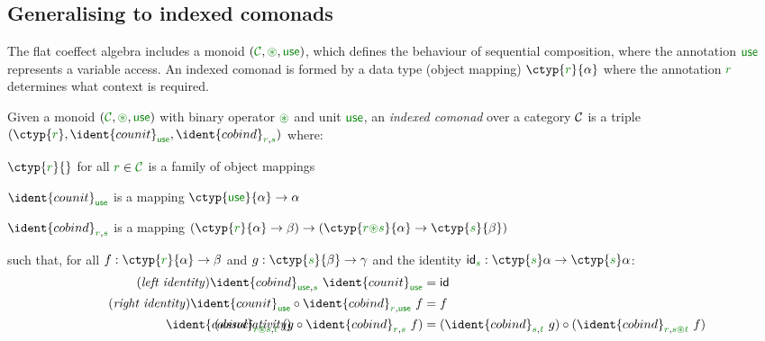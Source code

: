 
\subsection{Generalising to indexed comonads}
\label{sec:flat-semantics-idx}

The flat coeffect algebra includes a monoid $(\C, \cseq, \cunit)$, which defines the behaviour of
sequential composition, where the annotation $\cunit$ represents a variable access. An indexed 
comonad is formed by a data type (object mapping) $\ctyp{\cclrd{r}}{\alpha}$ where the annotation 
$\cclrd{r}$ determines what context is required. 

\begin{definition}
Given a monoid $(\C, \cseq, \cunit)$ with binary operator $\cseq$ and unit $\cunit$, an 
\emph{indexed comonad} over a category $\mathcal{C}$ is a triple 
$(\ctyp{\cclrd{r}{}}, \ident{counit}_{\cunit}, \ident{cobind}_{\cclrd{r}, \cclrd{s}})$ where:

\begin{compactitem}
\item $\ctyp{\cclrd{r}}{}$ for all $\cclrd{r} \in \C$ is a family of object mappings 
\item $\ident{counit}_{\cunit}$ is a mapping $\ctyp{\cunit}{\alpha} \rightarrow \alpha$ 
\item $\ident{cobind}_{\cclrd{r}, \cclrd{s}}$ is a mapping $(\ctyp{\cclrd{r}}{\alpha} \rightarrow \beta) 
  \rightarrow (\ctyp{\cclrd{r}\cseq\cclrd{s}}{\alpha} \rightarrow \ctyp{\cclrd{s}}{\beta})$
\end{compactitem}
such that, for all $f:\ctyp{\cclrd{r}}{\alpha} \rightarrow \beta$ and $g:\ctyp{\cclrd{s}}{\beta} \rightarrow \gamma$
and the identity $\idf{\cclrd{s}} : \ctyp{\cclrd{s}}\alpha \rightarrow \ctyp{\cclrd{s}}\alpha$:
\begin{align}
\tag{\emph{left identity}}
  \ident{cobind}_{\cunit, \cclrd{s}}~\ident{counit}_{\cunit} &= \idf{}
  \\
\tag{\emph{right identity}}
  \ident{counit}_{\cunit} \circ \ident{cobind}_{\cclrd{r}, \cunit}~f &= f
  \\
\tag{\emph{associativity}}
\hspace{-10em}
  \ident{cobind}_{\cclrd{r}\cseq\cclrd{s},\cclrd{t}}~(g \circ \ident{cobind}_{\cclrd{r}, \cclrd{s}}~f) &= 
    (\ident{cobind}_{\cclrd{s}, \cclrd{t}}~g) \circ (\ident{cobind}_{\cclrd{r}, \cclrd{s}\cseq\cclrd{t}}~f)
\end{align}
\end{definition}


